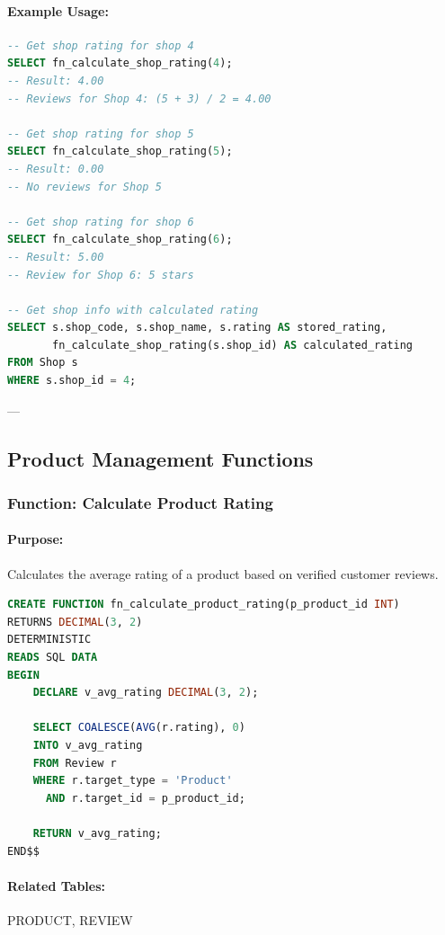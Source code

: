 \paragraph{Example Usage:}

\begin{lstlisting}[language=SQL]
-- Get shop rating for shop 4
SELECT fn_calculate_shop_rating(4);
-- Result: 4.00
-- Reviews for Shop 4: (5 + 3) / 2 = 4.00

-- Get shop rating for shop 5
SELECT fn_calculate_shop_rating(5);
-- Result: 0.00
-- No reviews for Shop 5

-- Get shop rating for shop 6
SELECT fn_calculate_shop_rating(6);
-- Result: 5.00
-- Review for Shop 6: 5 stars

-- Get shop info with calculated rating
SELECT s.shop_code, s.shop_name, s.rating AS stored_rating,
       fn_calculate_shop_rating(s.shop_id) AS calculated_rating
FROM Shop s
WHERE s.shop_id = 4;
\end{lstlisting}

---

\subsection{Product Management Functions}

\subsubsection{Function: Calculate Product Rating}

\paragraph{Purpose:} Calculates the average rating of a product based on verified customer reviews.

\begin{lstlisting}[language=SQL, caption=Function: fn\_calculate\_product\_rating, label=lst:fn_product_rating]
CREATE FUNCTION fn_calculate_product_rating(p_product_id INT)
RETURNS DECIMAL(3, 2)
DETERMINISTIC
READS SQL DATA
BEGIN
    DECLARE v_avg_rating DECIMAL(3, 2);
    
    SELECT COALESCE(AVG(r.rating), 0)
    INTO v_avg_rating
    FROM Review r
    WHERE r.target_type = 'Product'
      AND r.target_id = p_product_id;
    
    RETURN v_avg_rating;
END$$
\end{lstlisting}

\paragraph{Related Tables:} PRODUCT, REVIEW


